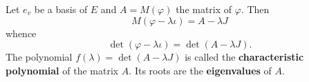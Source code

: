 Let $e_v$ be a basis of $E$ and $A = M(\varphi)$ the matrix of $\varphi$. Then
$$M(\varphi - \lambda \iota) = A - \lambda J$$
whence
$$\det(\varphi - \lambda \iota) = \det(A - \lambda J).$$
The polynomial $f(\lambda) = \det(A - \lambda J)$ is called the \textbf{characteristic polynomial} of the matrix $A$. Its roots are the \textbf{eigenvalues} of $A$.
